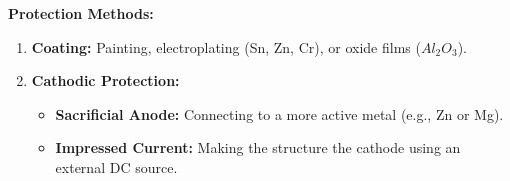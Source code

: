 \textbf{Protection Methods:}
\begin{enumerate}
    \item \textbf{Coating:} Painting, electroplating (Sn, Zn, Cr), or oxide films ($Al_2O_3$).
    \item \textbf{Cathodic Protection:}
        \begin{itemize}
            \item \textbf{Sacrificial Anode:} Connecting to a more active metal (e.g., Zn or Mg).
            \item \textbf{Impressed Current:} Making the structure the cathode using an external DC source.
        \end{itemize}
\end{enumerate}